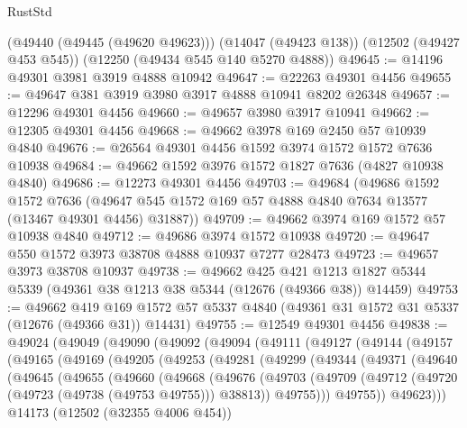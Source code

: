 \begin{lexlean}{RustStd}
\begin{coremodule}
    (@49440 (@49445 (@49620 @49623)))
    (@14047 (@49423 @138))
    (@12502 (@49427 @453 @545))
    (@12250 (@49434 @545 @140 @5270 @4888))
@49645 := @14196 @49301 @3981 @3919 @4888 @10942
@49647 := @22263 @49301 @4456
@49655 := @49647 @381 @3919 @3980 @3917 @4888 @10941 @8202 @26348
@49657 := @12296 @49301 @4456
@49660 := @49657 @3980 @3917 @10941
@49662 := @12305 @49301 @4456
@49668 := @49662 @3978 @169 @2450 @57 @10939 @4840
@49676 := @26564 @49301 @4456 @1592 @3974 @1572 @1572 @7636 @10938
@49684 := @49662 @1592 @3976 @1572 @1827 @7636 (@4827 @10938 @4840)
@49686 := @12273 @49301 @4456
@49703 := @49684
    (@49686
      @1592
      @1572
      @7636
      (@49647 @545 @1572 @169 @57 @4888 @4840 @7634 @13577 (@13467 @49301 @4456) @31887))
@49709 := @49662 @3974 @169 @1572 @57 @10938 @4840
@49712 := @49686 @3974 @1572 @10938
@49720 := @49647 @550 @1572 @3973 @38708 @4888 @10937 @7277 @28473
@49723 := @49657 @3973 @38708 @10937
@49738 := @49662
    @425
    @421
    @1213
    @1827
    @5344
    @5339
    (@49361 @38 @1213 @38 @5344 (@12676 (@49366 @38)) @14459)
@49753 := @49662
    @419
    @169
    @1572
    @57
    @5337
    @4840
    (@49361 @31 @1572 @31 @5337 (@12676 (@49366 @31)) @14431)
@49755 := @12549 @49301 @4456
@49838 := @49024
    (@49049
      (@49090
        (@49092
          (@49094
            (@49111
              (@49127
                (@49144
                  (@49157
                    (@49165
                      (@49169
                        (@49205
                          (@49253
                            (@49281
                              (@49299
                                (@49344
                                  (@49371
                                    (@49640
                                      (@49645
                                        (@49655
                                          (@49660
                                            (@49668
                                              (@49676
                                                (@49703
                                                  (@49709
                                                    (@49712
                                                      (@49720
                                                        (@49723 (@49738 (@49753 @49755)))
                                                        @38813))
                                                    @49755)))
                                              @49755))
                                          @49623)))
                                    @14173
                                    (@12502 (@32355 @4006 @454))

\end{coremodule}
\end{lexlean}
